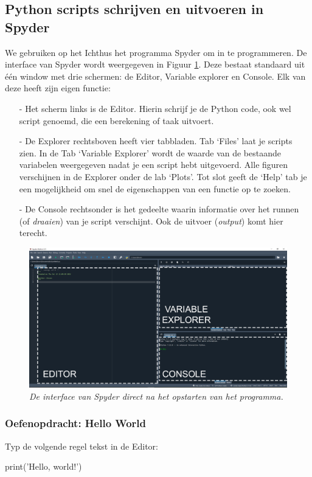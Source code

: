 \documentclass[a4paper,11pt, fleqn]{article}
\begin{document}
\subsection{Python scripts schrijven en uitvoeren in Spyder}
We gebruiken op het Ichthus het programma Spyder om in te programmeren. De interface van Spyder wordt weergegeven in Figuur \ref{fig-spyder}. Deze bestaat standaard uit \'e\'en window met drie schermen: de Editor, Variable explorer en Console. Elk van deze heeft zijn eigen functie:
\begin{itemize}
\item[-] Het scherm links is de Editor. Hierin schrijf je de Python code, ook wel script genoemd, die een berekening of taak uitvoert. 
\item[-] De Explorer rechtsboven heeft vier tabbladen. Tab `Files' laat je scripts zien. In de Tab `Variable Explorer' wordt de waarde van de bestaande variabelen weergegeven nadat je een script hebt uitgevoerd. Alle figuren verschijnen in de Explorer onder de lab `Plots'. Tot slot geeft de `Help' tab je een mogelijkheid om snel de eigenschappen van een functie op te zoeken.
\item[-] De Console rechtsonder is het gedeelte waarin informatie over het runnen (of \textit{draaien}) van je script verschijnt. Ook de uitvoer (\textit{output}) komt hier terecht.
\end{itemize}

\begin{figure}[h]
\includegraphics[width=16cm]{fig/spyder_screenshot.png}
\caption{\it De interface van Spyder direct na het opstarten van het programma.}
\label{fig-spyder}
\end{figure}

\subsubsection*{Oefenopdracht: Hello World} 
Typ de volgende regel tekst in de Editor: 
\begin{python}
print('Hello, world!')
\end{python}
\end{document}
